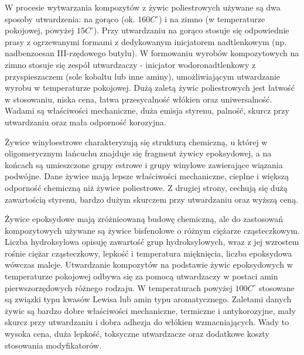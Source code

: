\documentclass[magister,druk]{dyplom}
\begin{document}
W procesie wytwarzania kompozytów z żywic poliestrowych używane są dwa sposoby utwardzenia: na gorąco (ok. $160 C^{\circ}$) i na zimno (w temperaturze pokojowej, powyżej $15 C^{\circ}$). Przy utwardzaniu na gorąco stosuje się odpowiednie prasy z ogrzewanymi formami z dedykowanym inicjatorem nadtlenkowym (np. nadbenzoesan III-rzędowego butylu). W formowaniu wyrobów kompozytowych na zimno stosuje się zespół utwardzaczy - inicjator wodoronadtlenkowy z przyspieszaczem (sole kobaltu lub inne aminy), umożliwiającym utwardzanie wyrobu w temperaturze pokojowej. Dużą zaletą żywic poliestrowych jest łatwość w stosowaniu, niska cena, łatwa przesycalność włókien oraz uniwersalność. Wadami są właściwości mechaniczne, duża emisja styrenu, palność, skurcz przy utwardzaniu oraz mała odporność korozyjna.

Żywice winyloestrowe charakteryzują się strukturą chemiczną, u której w oligomerycznym łańcuchu znajduje się fragment żywicy epoksydowej, a na końcach są umieszczone grupy estrowe i grupy winylowe zawierające wiązania podwójne. Dane żywice mają lepsze właściwości mechaniczne, cieplne i większą odporność chemiczną niż żywice poliestrowe. Z drugiej strony, cechują się dużą zawartością styrenu, bardzo dużym skurczem przy utwardzaniu oraz wyższą ceną. 

Żywice epoksydowe mają zróżnicowaną budowę chemiczną, ale do zastosowań kompozytowych używane są żywice bisfenolowe o różnym ciężarze cząsteczkowym. Liczba hydroksylowa opisuję zawartość grup hydroksylowych, wraz z jej wzrostem rośnie ciężar cząsteczkowy, lepkość i temperatura mięknięcia, liczba epoksydowa wówczas maleje. Utwardzanie kompozytów na podstawie żywic epoksydowych w temperaturze pokojowej odbywa się za pomocą utwardzaczy w postaci amin pierwszorzędowych różnego rodzaju. W temperaturach powyżej $100 C^{\circ}$ stosowane są związki typu kwasów Lewisa lub amin typu aromatycznego. Zaletami danych żywic są bardzo dobre właściwości mechaniczne, termiczne i antykorozyjne, mały skurcz przy utwardzaniu i dobra adhezja do włókien wzmacniających. Wady to wysoka cena, duża lepkość, toksyczne utwardzacze oraz dodatkowe koszty stosowania modyfikatorów. 
\end{document}
